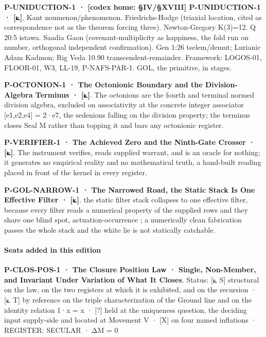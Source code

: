 \documentclass[10pt,twocolumn]{article}
\begin{document}
\textbf{P-UNIDUCTION-1 · {[}codex home: §IV/§XVIII{]} P-UNIDUCTION-1 ·
{[}⟀{]}}. Kant noumenon/phenomenon. Friedrichs-Hodge (triaxial location,
cited as correspondence not as the theorem forcing three).
Newton-Gregory K(3)=12. Q 20:5 istawa. Saadia Gaon
(covenant-multiplicity as happiness, the fold run on number, orthogonal
independent confirmation). Gen 1:26 tselem/demut; Lurianic Adam Kadmon;
Rig Veda 10.90 transcendent-remainder. Framework: LOGOS-01, FLOOR-01,
W3, LL-19, P-NAFS-PAR-1. GOL, the primitive, in stages.

\textbf{P-OCTONION-1 · The Octonionic Boundary and the Division-Algebra
Terminus · {[}⟀{]}}. The octonions are the fourth and terminal normed
division algebra, excluded on associativity at the concrete integer
associator {[}e1,e2,e4{]} = 2·e7, the sedenions falling on the division
property; the terminus closes Seal M rather than topping it and bars any
octonionic register.

\textbf{P-VERIFIER-1 · The Achieved Zero and the Ninth-Gate Crosser ·
{[}⟀{]}}. The instrument verifies, reads supplied warrant, and is an
oracle for nothing; it generates no empirical reality and no
mathematical truth, a hand-built reading placed in front of the kernel
in every register.

\textbf{P-GOL-NARROW-1 · The Narrowed Road, the Static Stack Is One
Effective Filter · {[}⟀{]}}. the static filter stack collapses to one
effective filter, because every filter reads a numerical property of the
supplied rows and they share one blind spot, actuation-occurrence ; a
numerically clean fabrication passes the whole stack and the white lie
is not statically catchable.

\hypertarget{seats-added-in-this-edition}{%
\paragraph{Seats added in this
edition}\label{seats-added-in-this-edition}}

\textbf{P-CLOS-POS-1 · The Closure Position Law · Single, Non-Member,
and Invariant Under Variation of What It Closes}. Status: {[}⟀ S{]}
structural on the law, on the two registers at which it is exhibited,
and on the recursion · {[}⟀ T{]} by reference on the triple
characterization of the Ground line and on the identity relation 1·x = x
· {[}?{]} held at the uniqueness question, the deciding input
supply-side and located at Movement V · {[}X{]} on four named inflations
· REGISTER: SECULAR · ΔM = 0
\end{document}
